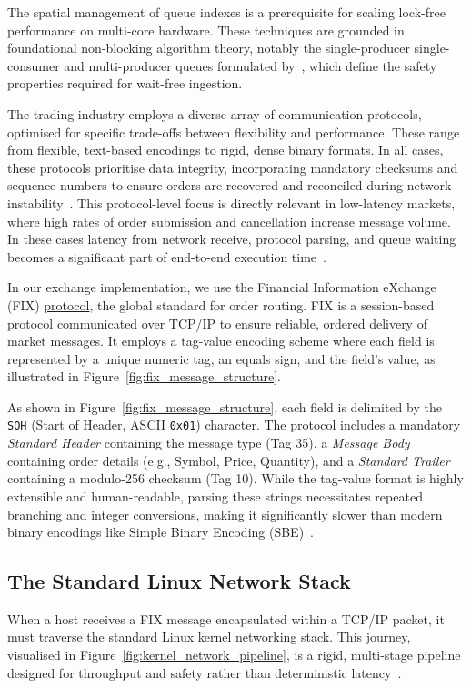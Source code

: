 The spatial management of queue indexes is a prerequisite for scaling 
lock-free performance on multi-core hardware. 
These techniques are grounded in foundational non-blocking algorithm theory, 
notably the single-producer single-consumer and multi-producer queues 
formulated by~\citet{michael1996simple}, which define the safety properties 
required for wait-free ingestion.


The trading industry employs a diverse array of communication protocols, 
optimised for specific trade-offs between flexibility and performance. 
These range from flexible, text-based encodings to rigid, dense 
binary formats. In all cases, these protocols prioritise data integrity, 
incorporating mandatory checksums and sequence numbers to 
ensure orders are recovered and reconciled during 
network instability~\citep{fix42_spec}.
This protocol-level focus is directly relevant in low-latency markets, where
high rates of order submission and cancellation increase message volume. In these cases
latency from network receive, protocol parsing, and queue waiting becomes a
significant part of end-to-end execution time~\citep{hasbrouck2013lowlatency}.

In our exchange implementation, we use the Financial Information eXchange 
(FIX) \hyperref[app:glossary]{protocol}, the global standard for order routing. 
FIX is a session-based protocol communicated over TCP/IP 
to ensure reliable, ordered delivery of market messages. 
It employs a tag-value encoding scheme where each field is represented 
by a unique numeric tag, an equals sign, and the field's value, as 
illustrated in Figure~\ref{fig:fix_message_structure}.



As shown in Figure~\ref{fig:fix_message_structure}, each field is delimited 
by the \texttt{SOH} (Start of Header, ASCII \texttt{0x01}) 
character. 
The protocol includes a mandatory \textit{Standard Header} containing 
the message type (Tag 35), a \textit{Message Body} containing order 
details (e.g., Symbol, Price, Quantity), and a \textit{Standard Trailer} 
containing a modulo-256 checksum (Tag 10). 
While the tag-value format is highly extensible and human-readable, 
parsing these strings necessitates repeated branching and integer 
conversions, making it significantly slower than modern binary 
encodings like Simple Binary Encoding (SBE)~\citep{dean2013tail}.

\subsection{The Standard Linux Network Stack}
When a host receives a FIX message encapsulated within 
a TCP/IP packet, it must traverse the standard Linux kernel networking 
stack. This journey, visualised in Figure~\ref{fig:kernel_network_pipeline}, 
is a rigid, multi-stage pipeline designed for throughput and safety rather 
than deterministic latency~\citep{benvenuti_networking, cai2021overhead}.

